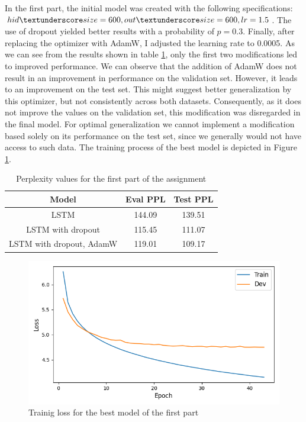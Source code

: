 \documentclass[a4paper]{article}
\begin{document}
In the first part, the initial model was created with the following specifications: \(hid \textunderscore size=600, out \textunderscore size=600, lr=1.5\).
The use of dropout yielded better results with a probability of \(p=0.3\). Finally, after replacing the optimizer with AdamW, I adjusted the learning rate to 0.0005.
As we can see from the results shown in table \ref{tab:results1}, only the first two modifications led to improved performance. 
We can observe that the addition of AdamW does not result in an improvement in performance on the validation set. However, it leads to an improvement on the test set. This might suggest better generalization by this optimizer, but not consistently across both datasets. Consequently, as it does not improve the values on the validation set, this modification was disregarded in the final model. For optimal generalization we cannot implement a modification based solely on its performance on the test set, since we generally would not have access to such data.
The training process of the best model is depicted in Figure \ref{fig:fig1}.

\begin{table}[h]
  \centering
  \begin{tabular}{|c|c|c|}
    \hline
    \textbf{Model} & \textbf{Eval PPL} & \textbf{Test PPL} \\
    \hline
    LSTM & 144.09 & 139.51 \\
    LSTM with dropout & 115.45 & 111.07 \\
    LSTM with dropout, AdamW & 119.01 & 109.17\\
    \hline
  \end{tabular}
  \caption{Perplexity values for the first part of the assignment}
  \label{tab:results1}

\end{table}

\begin{figure}[h]
  \includegraphics[width=\linewidth]{./images/plot_1_loss.png}
  \caption{Trainig loss for the best model of the first part}
  \label{fig:fig1}
\end{figure}
\end{document}
